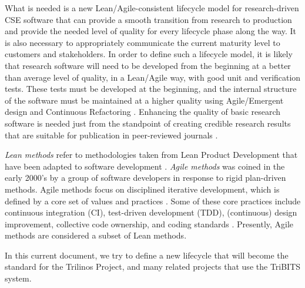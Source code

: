 \documentclass[11pt]{SANDreport}
\begin{document}
What is needed is a new Lean/Agile-consistent lifecycle model for
research-driven CSE software that can provide a smooth transition from
research to production and provide the needed level of quality for
every lifecycle phase along the way.  It is also necessary to
appropriately communicate the current maturity level to customers and
stakeholders.  In order to define such a lifecycle model, it is likely
that research software will need to be developed from the beginning at
a better than average level of quality, in a Lean/Agile way, with good
unit and verification tests.  These tests must be developed at the
beginning, and the internal structure of the software must be
maintained at a higher quality using Agile/Emergent design and
Continuous Refactoring {}\cite{ref:emergent_design_08}.  Enhancing the
quality of basic research software is needed just from the standpoint
of creating credible research results that are suitable for
publication in peer-reviewed journals
{}\cite{CompSciDemandsNewParadigm05,
ScientistsNightmareFiveRetractions2006}.

\textit{Lean methods} refer to methodologies taken
from Lean Product Development that have been adapted to software
development {}\cite{ImplementingLeanSoftwareDevelopment}.  
\textit{Agile methods} was coined in the early 2000's by a group of
software developers in response to rigid plan-driven methods.
Agile methods focus on disciplined iterative development, which is
defined by a core set of values and practices
{}\cite{AgileSoftwareDevelopment, Scrum, XP2}.  Some of these core
practices include continuous integration (CI), test-driven
development (TDD), (continuous) design improvement, collective code
ownership, and coding standards {}\cite{AgileSoftwareDevelopment,
XP2}.  Presently, Agile methods are considered a subset of Lean
methods.

In this current document, we try to define a new lifecycle that will
become the standard for the Trilinos Project, and many
related projects that use the TriBITS system.
\end{document}
